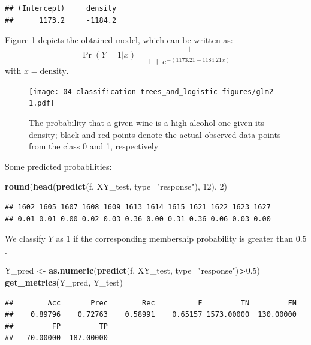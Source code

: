\documentclass[10pt,b5paper,krantz1]{krantz}
\newenvironment{Shaded}{\begin{snugshade}}{\end{snugshade}}
\newcommand{\DataTypeTok}[1]{\textcolor[rgb]{0.27,0.27,0.27}{#1}}
\newcommand{\DecValTok}[1]{\textcolor[rgb]{0.06,0.06,0.06}{#1}}
\newcommand{\FloatTok}[1]{\textcolor[rgb]{0.06,0.06,0.06}{#1}}
\newcommand{\KeywordTok}[1]{\textcolor[rgb]{0.27,0.27,0.27}{\textbf{#1}}}
\newcommand{\NormalTok}[1]{#1}
\newcommand{\OperatorTok}[1]{\textcolor[rgb]{0.43,0.43,0.43}{\textbf{#1}}}
\newcommand{\StringTok}[1]{\textcolor[rgb]{0.5,0.5,0.5}{#1}}
\begin{document}
\begin{verbatim}
## (Intercept)     density 
##      1173.2     -1184.2
\end{verbatim}

Figure \ref{fig:glm2} depicts the obtained model, which can be written
as:
\[
\Pr(Y=1|x)=\displaystyle\frac{1}{1+e^{-\left(
1173.21-1184.21x
\right)}
}
\]
with \(x=\text{density}\).

\begin{figure}
\hypertarget{fig:glm2}{%
\centering
\texttt{[image: 04-classification-trees\_and\_logistic-figures/glm2-1.pdf]}
\caption{The probability that a given wine is a high-alcohol one given its density; black and red points denote the actual observed data points from the class 0 and 1, respectively}\label{fig:glm2}
}
\end{figure}

Some predicted probabilities:

\begin{Shaded}
\begin{Highlighting}[]
\KeywordTok{round}\NormalTok{(}\KeywordTok{head}\NormalTok{(}\KeywordTok{predict}\NormalTok{(f, XY_test, }\DataTypeTok{type=}\StringTok{"response"}\NormalTok{), }\DecValTok{12}\NormalTok{), }\DecValTok{2}\NormalTok{)}
\end{Highlighting}
\end{Shaded}

\begin{verbatim}
## 1602 1605 1607 1608 1609 1613 1614 1615 1621 1622 1623 1627 
## 0.01 0.01 0.00 0.02 0.03 0.36 0.00 0.31 0.36 0.06 0.03 0.00
\end{verbatim}

We classify \(Y\) as 1 if the corresponding membership probability
is greater than \(0.5\).

\begin{Shaded}
\begin{Highlighting}[]
\NormalTok{Y_pred <-}\StringTok{ }\KeywordTok{as.numeric}\NormalTok{(}\KeywordTok{predict}\NormalTok{(f, XY_test, }\DataTypeTok{type=}\StringTok{"response"}\NormalTok{)}\OperatorTok{>}\FloatTok{0.5}\NormalTok{)}
\KeywordTok{get_metrics}\NormalTok{(Y_pred, Y_test)}
\end{Highlighting}
\end{Shaded}

\begin{verbatim}
##        Acc       Prec        Rec          F         TN         FN 
##    0.89796    0.72763    0.58991    0.65157 1573.00000  130.00000 
##         FP         TP 
##   70.00000  187.00000
\end{verbatim}
\end{document}
